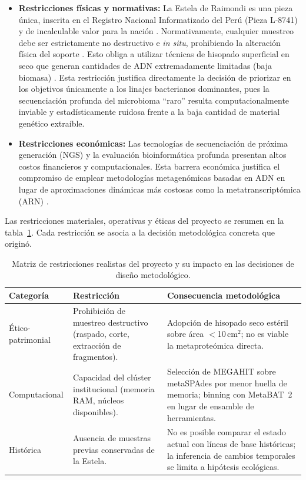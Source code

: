 \begin{itemize}
    \item \textbf{Restricciones físicas y normativas:} La Estela de Raimondi es una pieza única, inscrita en el Registro Nacional Informatizado del Perú (Pieza L-8741) y de incalculable valor para la nación \citep{mnaahp2015}. Normativamente, cualquier muestreo debe ser estrictamente no destructivo e \textit{in situ}, prohibiendo la alteración física del soporte \citep{branysova2022}. Esto obliga a utilizar técnicas de hisopado superficial en seco que generan cantidades de ADN extremadamente limitadas (baja biomasa) \citep{tsukayama2025informe}. Esta restricción justifica directamente la decisión de priorizar en los objetivos únicamente a los linajes bacterianos dominantes, pues la secuenciación profunda del microbioma ``raro'' resulta computacionalmente inviable y estadísticamente ruidosa frente a la baja cantidad de material genético extraíble.
    
    \item \textbf{Restricciones económicas:} Las tecnologías de secuenciación de próxima generación (NGS) y la evaluación bioinformática profunda presentan altos costos financieros y computacionales. Esta barrera económica justifica el compromiso de emplear metodologías metagenómicas basadas en ADN en lugar de aproximaciones dinámicas más costosas como la metatranscriptómica (ARN) \citep{branysova2022}.
\end{itemize}

Las restricciones materiales, operativas y éticas del proyecto se
resumen en la tabla~\ref{tab:restricciones}. Cada restricción se asocia
a la decisión metodológica concreta que originó.

\begin{table}[htbp]
  \centering
  \small
  \caption{Matriz de restricciones realistas del proyecto y su impacto
    en las decisiones de diseño metodológico.}
  \label{tab:restricciones}
  \begin{tabular}{p{2.3cm} p{4.5cm} p{7cm}}
    \toprule
    \textbf{Categoría} & \textbf{Restricción} & \textbf{Consecuencia metodológica} \\
    \midrule
    Ético-patrimonial
      & Prohibición de muestreo destructivo (raspado, corte, extracción de fragmentos).
      & Adopción de hisopado seco estéril sobre área $<$10\,cm$^{2}$; no es viable la metaproteómica directa. \\

    \midrule
    Computacional
      & Capacidad del clúster institucional (memoria RAM, núcleos disponibles).
      & Selección de MEGAHIT sobre metaSPAdes por menor huella de memoria; binning con MetaBAT~2 en lugar de ensamble de herramientas. \\
    \midrule
    Histórica
      & Ausencia de muestras previas conservadas de la Estela.
      & No es posible comparar el estado actual con líneas de base históricas; la inferencia de cambios temporales se limita a hipótesis ecológicas. \\
    \bottomrule
  \end{tabular}
\end{table}

